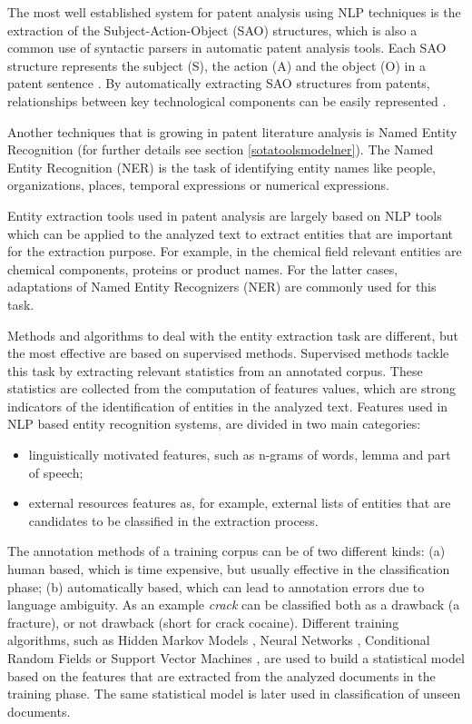 \documentclass[]{book}
\providecommand{\tightlist}{%
  \setlength{\itemsep}{0pt}\setlength{\parskip}{0pt}}
\begin{document}
The most well established system for patent analysis using NLP
techniques is the extraction of the Subject-Action-Object (SAO)
structures, which is also a common use of syntactic parsers in automatic
patent analysis tools. Each SAO structure represents the subject (S),
the action (A) and the object (O) in a patent sentence
\citep{yoon2011identifying}. By automatically extracting SAO structures
from patents, relationships between key technological components can be
easily represented
\citep{yoon2013identifying, choi2011sao, park2011identifying}.

Another techniques that is growing in patent literature analysis is
Named Entity Recognition (for further details see section
\ref{sotatoolsmodelner}). The Named Entity Recognition (NER) is the task
of identifying entity names like people, organizations, places, temporal
expressions or numerical expressions.

Entity extraction tools used in patent analysis are largely based on NLP
tools which can be applied to the analyzed text to extract entities that
are important for the extraction purpose. For example, in the chemical
field relevant entities are chemical components, proteins or product
names. For the latter cases, adaptations of Named Entity Recognizers
(NER) are commonly used for this task.

Methods and algorithms to deal with the entity extraction task are
different, but the most effective are based on supervised methods.
Supervised methods tackle this task by extracting relevant statistics
from an annotated corpus. These statistics are collected from the
computation of features values, which are strong indicators of the
identification of entities in the analyzed text. Features used in NLP
based entity recognition systems, are divided in two main categories:

\begin{itemize}
\tightlist
\item
  linguistically motivated features, such as n-grams of words, lemma and
  part of speech;
\item
  external resources features as, for example, external lists of
  entities that are candidates to be classified in the extraction
  process.
\end{itemize}

The annotation methods of a training corpus can be of two different
kinds: (a) human based, which is time expensive, but usually effective
in the classification phase; (b) automatically based, which can lead to
annotation errors due to language ambiguity. As an example \emph{crack}
can be classified both as a drawback (a fracture), or not drawback
(short for crack cocaine). Different training algorithms, such as Hidden
Markov Models \citep{hmm}, Neural Networks \citep{nnet}, Conditional
Random Fields \citep{crf} or Support Vector Machines \citep{svm}, are
used to build a statistical model based on the features that are
extracted from the analyzed documents in the training phase. The same
statistical model is later used in classification of unseen documents.
\end{document}
